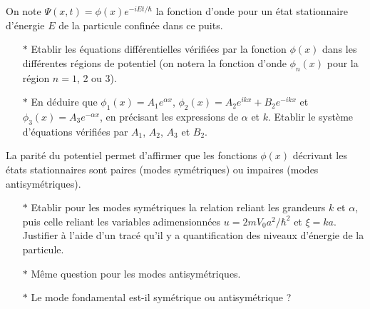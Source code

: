 \documentclass{report}
\begin{document}
On note $\Psi(x,t)=\phi(x)e^{-iEt/\hbar}$ la fonction d'onde pour un état stationnaire d'énergie $E$ de la particule confinée dans ce puits. 

\begin{itemize}

	\item[$\ast$] Etablir les équations différentielles vérifiées par la fonction $\phi(x)$ dans les différentes régions de potentiel (on notera la fonction d'onde $\phi_n(x)$ pour la région $n=1$, 2 ou 3). 
	
	\item[$\ast$] En déduire que $\phi_1(x)=A_1e^{\alpha x}$, $\phi_2(x)=A_2e^{ik x}+B_2e^{-ik x}$ et $\phi_3(x)=A_3e^{-\alpha x}$, en précisant les expressions de $\alpha$ et $k$. Etablir le système d'équations vérifiées par $A_1$, $A_2$, $A_3$ et $B_2$.

\end{itemize}

La parité du potentiel permet d'affirmer que les fonctions $\phi(x)$ décrivant les états stationnaires sont paires (modes symétriques) ou impaires (modes antisymétriques). 

\begin{itemize}

	\item[$\ast$] Etablir pour les modes symétriques la relation reliant les grandeurs $k$ et $\alpha$, puis celle reliant les variables adimensionnées $u=2mV_0a^2/\hbar^2$ et $\xi=ka$. Justifier à l'aide d'un tracé qu'il y a quantification des niveaux d'énergie de la particule. 
	
	\item[$\ast$]Même question pour les modes antisymétriques.
	
	\item[$\ast$] Le mode fondamental est-il symétrique ou antisymétrique ?

\end{itemize}
\end{document}
